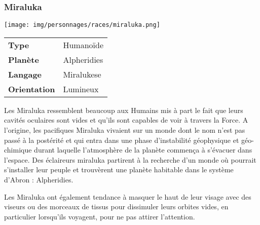 \subsubsection{Miraluka}
\begin{samepage}
	\vspace{-2\baselineskip}
	\texttt{[image: img/personnages/races/miraluka.png]}

	\vspace{-5\baselineskip}

	\begin{flushright}
		\begin{tabular}{ l l }
			\textbf{Type} 			& Humanoïde \\
		   	\textbf{Planète} 		& Alpheridies \\
		   	\textbf{Langage} 		& Miralukese \\
		   	\textbf{Orientation} 	& Lumineux \\
		\end{tabular}
	\end{flushright}
\end{samepage}

Les Miraluka ressemblent beaucoup aux Humains mis à part le fait que leurs cavités oculaires sont vides et qu’ils sont capables de voir à travers la Force. A l’origine, les pacifiques Miraluka vivaient sur un monde dont le nom n’est pas passé à la postérité et qui entra dans une phase d’instabilité géophysique et géo-chimique durant laquelle l’atmosphère de la planète commença à s’évacuer dans l’espace. Des éclaireurs miraluka partirent à la recherche d’un monde où pourrait s’installer leur peuple et trouvèrent une planète habitable dans le système d’Abron : Alpheridies. 

Les Miraluka ont également tendance à masquer le haut de leur visage avec des viseurs ou des morceaux de tissus pour dissimuler leurs orbites vides, en particulier lorsqu’ils voyagent, pour ne pas attirer l’attention.


